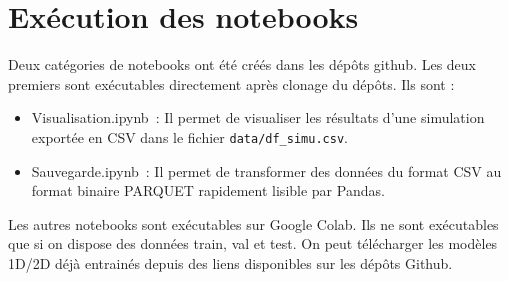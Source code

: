 \section{Exécution des notebooks}
Deux catégories de notebooks ont été créés dans les dépôts github. Les deux premiers sont exécutables directement après clonage du dépôts. Ils sont :
\begin{itemize}
 \item Visualisation.ipynb : Il permet de visualiser les résultats d'une simulation exportée en CSV dans le fichier \verb|data/df_simu.csv|.
 \item Sauvegarde.ipynb : Il permet de transformer des données du format CSV au format binaire PARQUET rapidement lisible par Pandas.
\end{itemize}

Les autres notebooks sont exécutables sur Google Colab. Ils ne sont exécutables que si on dispose des données train, val et test. On peut télécharger les modèles 1D/2D déjà entrainés depuis des liens disponibles sur les dépôts Github.
